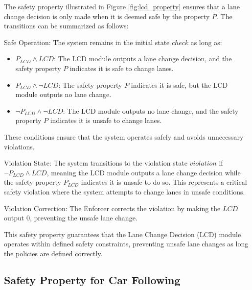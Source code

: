 The safety property illustrated in Figure \ref{fig:lcd_property} ensures that a lane change decision is only made when it is deemed safe by the property $P$. The transitions can be summarized as follows:

Safe Operation: The system remains in the initial state $check$ as long as:
  \begin{itemize}
    \item $P_{LCD} \land LCD$: The LCD module outputs a lane change decision, and the safety property $P$ indicates it is safe to change lanes.
    \item $P_{LCD} \land \neg LCD$: The safety property $P$ indicates it is safe, but the LCD module outputs no lane change.
    \item $\neg P_{LCD} \land \neg LCD$: The LCD module outputs no lane change, and the safety property $P$ indicates it is unsafe to change lanes.
  \end{itemize}
  These conditions ensure that the system operates safely and avoids unnecessary violations.

Violation State: The system transitions to the violation state $violation$ if $\neg P_{LCD} \land LCD$, meaning the LCD module outputs a lane change decision while the safety property $P_{LCD}$ indicates it is unsafe to do so. This represents a critical safety violation where the system attempts to change lanes in unsafe conditions.

Violation Correction: The Enforcer corrects the violation by making the $LCD$ output 0, preventing the unsafe lane change. 

This safety property guarantees that the Lane Change Decision (LCD) module operates within defined safety constraints, preventing unsafe lane changes as long the policies are defined correctly.



\subsection{Safety Property for Car Following}

